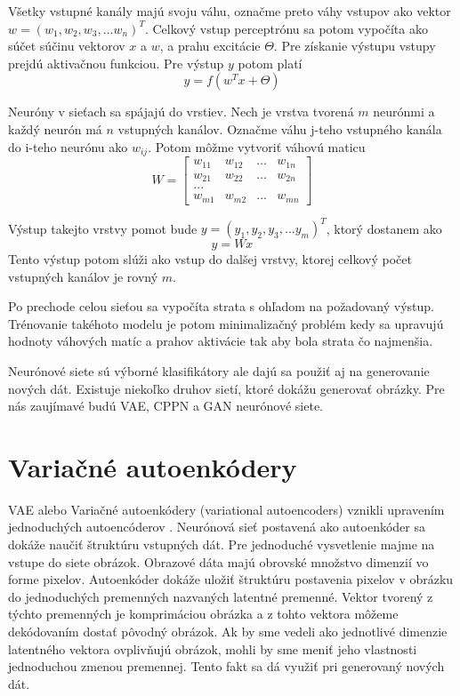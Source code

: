 Všetky vstupné kanály majú svoju váhu, označme preto váhy vstupov ako vektor \(w = (w_1, w_2, w_3, ... w_n)^T\).
Celkový vstup perceptrónu sa potom vypočíta ako súčet súčinu vektorov \(x\) a \(w\), a prahu excitácie \(\Theta\).
Pre získanie výstupu vstupy prejdú aktivačnou funkciou.
Pre výstup \(y\) potom platí \[y = f(w^Tx + \Theta)\]

Neuróny v sieťach sa spájajú do vrstiev. Nech je vrstva tvorená \(m\) neurónmi a každý neurón má \(n\) vstupných kanálov.
Označme váhu j-teho vstupného kanála do i-teho neurónu ako \(w_{ij}\).
Potom môžme vytvoriť váhovú maticu
\[
W = \begin{bmatrix}
		w_{11} & w_{12} & \dots & w_{1n} \\
		w_{21} & w_{22} & \dots & w_{2n} \\
		{...}							\\
		w_{m1} & w_{m2} & \dots & w_{mn}
     \end{bmatrix}
\]

Výstup takejto vrstvy pomot bude \(y = (y_1, y_2, y_3, ... y_m)^T\), ktorý dostanem ako \[y = Wx\]
Tento výstup potom slúži ako vstup do dalšej vrstvy, ktorej celkový počet vstupných kanálov je rovný \(m\).

Po prechode celou sieťou sa vypočíta strata s ohľadom na požadovaný výstup.
Trénovanie takéhoto modelu je potom minimalizačný problém kedy sa upravujú hodnoty váhových matíc a prahov aktivácie tak aby bola strata čo najmenšia.

Neurónové siete sú výborné klasifikátory ale dajú sa použiť aj na generovanie nových dát.
Existuje niekoľko druhov sietí, ktoré dokážu generovať obrázky.
Pre nás zaujímavé budú VAE, CPPN a GAN neurónové siete. 

\section{Variačné autoenkódery}
VAE alebo Variačné autoenkódery (variational autoencoders) vznikli upravením jednoduchých autoencóderov \cite{VAE}.
Neurónová sieť postavená ako autoenkóder sa dokáže naučiť štruktúru vstupných dát.
Pre jednoduché vysvetlenie majme na vstupe do siete obrázok.
Obrazové dáta majú obrovské množstvo dimenzií vo forme pixelov.
Autoenkóder dokáže uložiť štruktúru postavenia pixelov v obrázku do jednoduchých premenných nazvaných latentné premenné.
Vektor tvorený z týchto premenných je komprimáciou obrázka a z tohto vektora môžeme dekódovaním dostať pôvodný obrázok.
Ak by sme vedeli ako jednotlivé dimenzie latentného vektora ovplivňujú obrázok, mohli by sme meniť jeho vlastnosti jednoduchou zmenou premennej.
Tento fakt sa dá využiť pri generovaný nových dát.

